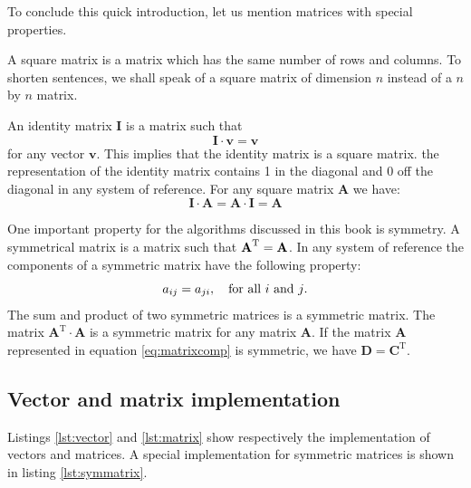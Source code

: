 To conclude this quick introduction, let us mention matrices with
special properties.

A square matrix is a matrix which has the same number of rows and
columns. To shorten sentences, we shall speak of a square matrix
of dimension $n$ instead of a $n$ by $n$ matrix.

An identity matrix $\textbf{I}$ is a matrix such that
\begin{equation}
  \textbf{I}\cdot\textbf{v}=\textbf{v}
\end{equation}
for any vector $\textbf{v}$. This implies that the identity matrix is
a square matrix. the representation of the identity matrix
contains 1 in the diagonal and 0 off the diagonal in any system of
reference. For any square matrix $\textbf{A}$ we have:
\begin{equation}
  \textbf{I}\cdot\textbf{A}=\textbf{A}\cdot\textbf{I}=\textbf{A}
\end{equation}

One important property for the algorithms discussed in this book
is symmetry. A symmetrical matrix is a matrix such that ${\textbf
A}^{\mathop{\textrm{T}}}={\textbf{A}}$. In any system of reference the
components of a symmetric matrix have the following property:
\begin{equation}
  a_{ij}=a_{ji}, \mbox{\quad for all $i$ and $j$.}
\end{equation}
The sum and product of two symmetric matrices is a symmetric
matrix. The matrix ${\textbf{A}}^{\mathop{\textrm{T}}}\cdot{\textbf{A}}$ is a
symmetric matrix for any matrix ${\textbf{A}}$. If the matrix ${\textbf{A}}$
represented in equation \ref{eq:matrixcomp} is symmetric, we have
${\textbf{D}}={\textbf{C}}^{\mathop{\textrm{T}}}$.

\subsection{Vector and matrix implementation}
\label{sec:slinearalgebra}
Listings \ref{lst:vector} and \ref{lst:matrix} show respectively the implementation of vectors and matrices.
A special implementation for symmetric matrices is shown in listing \ref{lst:symmatrix}.

